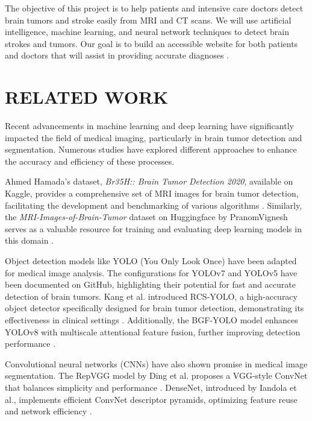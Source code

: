\documentclass[conference]{IEEEtran}
\begin{document}
The objective of this project is to help patients and intensive care doctors detect brain tumors and stroke easily from MRI and CT scans. We will use artificial intelligence, machine learning, and neural network techniques to detect brain strokes and tumors. Our goal is to build an accessible website for both patients and doctors that will assist in providing accurate diagnoses \cite{ma82, dattaad:10.1504}.

\section{ RELATED WORK}


Recent advancements in machine learning and deep learning have significantly impacted the field of medical imaging, particularly in brain tumor detection and segmentation. Numerous studies have explored different approaches to enhance the accuracy and efficiency of these processes.

Ahmed Hamada's dataset, \emph{Br35H:: Brain Tumor Detection 2020}, available on Kaggle, provides a comprehensive set of MRI images for brain tumor detection, facilitating the development and benchmarking of various algorithms \cite{br35h}. Similarly, the \emph{MRI-Images-of-Brain-Tumor} dataset on Huggingface by PranomVignesh serves as a valuable resource for training and evaluating deep learning models in this domain \cite{huggingface_data}.

Object detection models like YOLO (You Only Look Once) have been adapted for medical image analysis. The configurations for YOLOv7 \cite{wong2020yolo7} and YOLOv5 \cite{jocher2022yolo5} have been documented on GitHub, highlighting their potential for fast and accurate detection of brain tumors. Kang et al. introduced RCS-YOLO, a high-accuracy object detector specifically designed for brain tumor detection, demonstrating its effectiveness in clinical settings \cite{Kang2023}. Additionally, the BGF-YOLO model enhances YOLOv8 with multiscale attentional feature fusion, further improving detection performance \cite{kang2023bgfyolo}.

Convolutional neural networks (CNNs) have also shown promise in medical image segmentation. The RepVGG model by Ding et al. proposes a VGG-style ConvNet that balances simplicity and performance \cite{ding2021repvgg}. DenseNet, introduced by Iandola et al., implements efficient ConvNet descriptor pyramids, optimizing feature reuse and network efficiency \cite{iandola2014densenet}.
\end{document}
